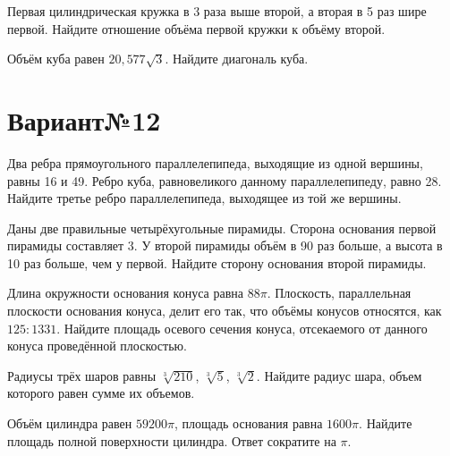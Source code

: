 \documentclass[4apaper]{article}
\begin{document}
\begin{taskBN}{5}
 Первая цилиндрическая кружка в 3 раза выше второй, а вторая в 5 раз шире первой. Найдите отношение объёма первой кружки к объёму второй.
\end{taskBN}

\begin{taskBN}{6}
Объём куба равен $20,577\sqrt{3}$. Найдите диагональ куба.
\end{taskBN}
\newpage\section*{Вариант№12}

\begin{taskBN}{1}
Два ребра прямоугольного параллелепипеда, выходящие из одной вершины, равны 16 и 49. Ребро куба, равновеликого данному параллелепипеду, равно 28. Найдите третье ребро параллелепипеда, выходящее из той же вершины.
\end{taskBN}

\begin{taskBN}{2}
Даны две правильные четырёхугольные пирамиды. Сторона основания первой пирамиды составляет 3. У второй пирамиды объём в 90 раз больше, а высота в 10 раз больше, чем у первой. Найдите сторону основания второй пирамиды.
\end{taskBN}

\begin{taskBN}{3}
Длина окружности основания конуса равна $88\pi$. Плоскость, параллельная плоскости основания конуса,  делит его так, что объёмы конусов относятся, как $125:1331$. Найдите площадь осевого сечения конуса, отсекаемого от данного конуса проведённой плоскостью. 
\end{taskBN}

\begin{taskBN}{4}
Радиусы трёх шаров равны $\sqrt[3]{210}$, $\sqrt[3]{5}$, $\sqrt[3]{2}$. Найдите радиус шара, объем которого равен сумме их объемов.
\end{taskBN}

\begin{taskBN}{5}
Объём цилиндра равен $59200\pi$, площадь основания равна $1600\pi$. Найдите площадь полной поверхности цилиндра. Ответ сократите на $\pi$.
\end{taskBN}
\end{document}
